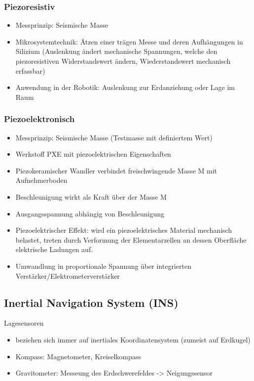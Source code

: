 \documentclass[paper=a4, fontsize=11pt]{scrartcl} %
\numberwithin{equation}{section} %
\numberwithin{figure}{section} %
\numberwithin{table}{section} %
\begin{document}
\subsubsection{Piezoresistiv}

\begin{itemize}
\item Messprinzip: Seismische Masse
\item Mikrosystemtechnik: Ätzen einer trägen Messe und deren Aufhängungen in Silizium (Auslenkung ändert mechanische Spannungen, welche den piezoresistiven Widerstandswert ändern, Wiederstandswert mechanisch erfassbar)
\item Anwendung in der Robotik: Auslenkung zur Erdanziehung oder Lage im Raum
\end{itemize}

\subsubsection{Piezoelektronisch}

\begin{itemize}
\item Messprinzip: Seismische Masse (Testmasse mit definiertem Wert)
\item Werkstoff PXE mit piezoelektrischen Eigenschaften
\item Piezokeramischer Wandler verbindet freischwingende Masse M mit Aufnehmerboden
\item Beschleunigung wirkt als Kraft über der Masse M
\item Ausgangsspannung abhängig von Beschleunigung
\item Piezoelektrischer Effekt: wird ein piezoelektrisches Material mechanisch belastet, treten durch Verformung der Elementarzellen an dessen Oberfläche elektrische Ladungen auf.
\item Umwandlung in proportionale Spannung über integrierten Verstärker/Elektrometerverstärker 
\end{itemize}

\subsection{Inertial Navigation System (INS)}

Lagesensoren
\begin{itemize}
\item beziehen sich immer auf inertiales Koordinatensystem (zumeist auf Erdkugel)
\item Kompass: Magnetometer, Kreiselkompass
\item Gravitometer: Messeung des Erdschwerefeldes -> Neigungssensor
\end{itemize}
\end{document}
